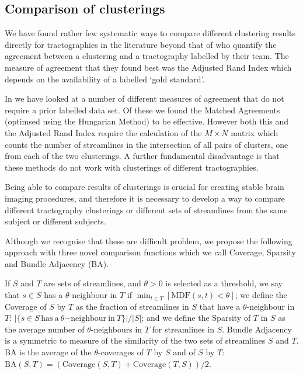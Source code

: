 \documentclass{bioinfo}
\begin{document}
\begin{methods}
\subsection{Comparison of clusterings\label{sub:Tightness-comparisons-1}}

We have found rather few systematic ways to compare different clustering
results directly for tractographies in the literature beyond that of
\citep{moberts2005evaluation} who quantify the agreement between a
clustering and a tractography labelled by their team. The measure of
agreement that they found best was the Adjusted Rand Index which depends
on the availability of a labelled `gold standard'.

In \cite{Garyfallidis_thesis} we have looked at a number of different
measures of agreement that do not require a prior labelled data set. Of
these we found the Matched Agreements (optimsed using the Hungarian
Method) to be effective. However both this and the Adjusted Rand Index
require the calculation of the $M \times N$ matrix which counts the
number of streamlines in the intersection of all pairs of clusters, one
from each of the two clusterings. A further fundamental disadvantage is
that these methods do not work with clusterings of different
tractographies.

Being able to compare results of clusterings is crucial for creating
stable brain imaging procedures, and therefore it is necessary to
develop a way to compare different tractography clusterings or different
sets of streamlines from the same subject or different subjects.

Although we recognise that these are difficult problem, we propose the
following approach with three novel comparison functions which we call
Coverage, Sparsity and Bundle Adjacency (BA).

If $S$ and $T$ are sets of streamlines, and $\theta>0$ is selected as a
threshold, we say that $s \in S$ has a $\theta$-neighbour in $T$ if
$\min_{t\in T}[\mathrm{MDF}(s,t)<\theta]$; we define the Coverage of $S$
by $T$ as the fraction of streamlines in $S$ that have a
$\theta$-neighbour in $T$: $|\{s \in S
\,\mathrm{has~a}~\theta\mathrm{-neighbour~in}~T\}|/|S|$; and we define
the Sparsity of $T$ in $S$ as the average number of $\theta$-neighbours
in $T$ for streamlines in $S$. Bundle Adjacency is a symmetric to
measure of the similarity of the two sets of streamlines $S$ and $T$. BA
is the average of the $\theta$-coverages of $T$ by $S$ and of $S$ by
$T$: $\mathrm{BA}(S,T) = (\mathrm{Coverage}(S,T) +
\mathrm{Coverage}(T,S))/2$.


\end{methods}
\end{document}
